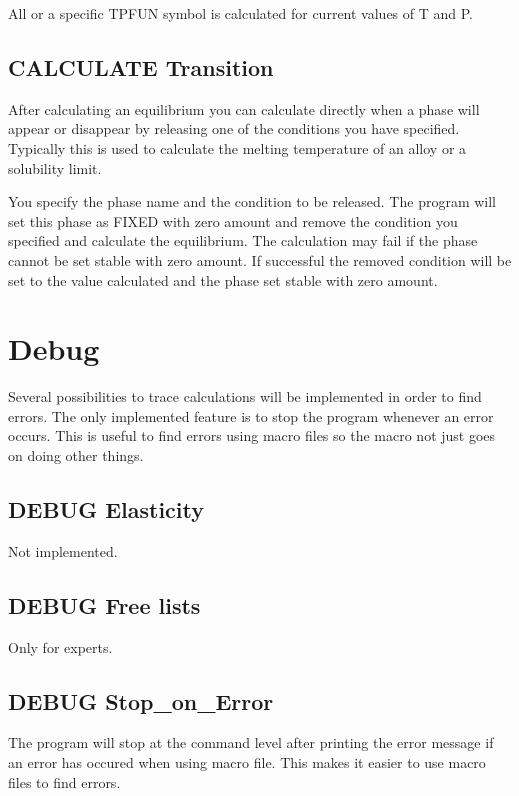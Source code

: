 \documentclass[12pt]{article}
\begin{document}
All or a specific TPFUN symbol is calculated for current values of T
and P.

\subsection{CALCULATE Transition}

After calculating an equilibrium you can calculate directly when a
phase will appear or disappear by releasing one of the conditions you
have specified.  Typically this is used to calculate the melting
temperature of an alloy or a solubility limit.  

You specify the phase name and the condition to be released.  The
program will set this phase as FIXED with zero amount and remove the
condition you specified and calculate the equilibrium.  The
calculation may fail if the phase cannot be set stable with zero
amount.  If successful the removed condition will be set to the value
calculated and the phase set stable with zero amount.

\section{Debug }

Several possibilities to trace calculations will be implemented in
order to find errors.  The only implemented feature is to stop the
program whenever an error occurs.  This is useful to find errors using
macro files so the macro not just goes on doing other things.

\subsection{DEBUG Elasticity}

Not implemented.

\subsection{DEBUG Free lists}

Only for experts.

\subsection{DEBUG Stop\_on\_Error}

The program will stop at the command level after printing the error
message if an error has occured when using macro file.  This makes it
easier to use macro files to find errors.
\end{document}
